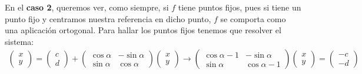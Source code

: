 \documentclass[14pt]{book}
\begin{document}
\begin{tm}
\end{tm}

En el \textbf{caso 2}, queremos ver, como siempre, si $f$ tiene puntos fijos, pues si tiene un punto fijo y centramos nuestra referencia en dicho punto, $f$ se comporta como una aplicación ortogonal. Para hallar los puntos fijos tenemos que resolver el sistema:
\begin{align*}
	\left(\begin{array}{c}
	x \\ y
	\end{array}\right) = \left(\begin{array}{c}
	c \\ d
	\end{array}\right) + 
	\left(\begin{array}{cc}
	\cos \alpha & - \sin \alpha \\ \sin \alpha & \cos \alpha
	\end{array}\right)\left(\begin{array}{c}
	x \\ y
	\end{array}\right) \to 
		\left(\begin{array}{cc}
	\cos \alpha - 1 & - \sin \alpha \\ \sin \alpha & \cos \alpha - 1
	\end{array}\right)\left(\begin{array}{c}
	x \\ y
	\end{array}\right) = \left(\begin{array}{c}
	-c \\ -d
	\end{array}\right)
\end{align*}
\end{document}
